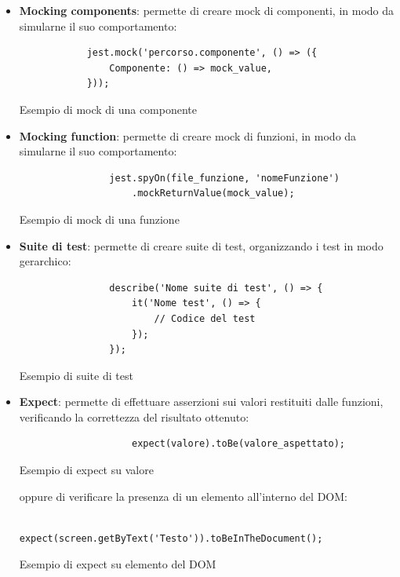 \begin{itemize}
    \item \textbf{Mocking components}: permette di creare mock di componenti, in modo da simularne il suo comportamento:
          \begin{listing}[H]
              \begin{verbatim}
            jest.mock('percorso.componente', () => ({
                Componente: () => mock_value,
            }));
            \end{verbatim}
              \caption{Esempio di mock di una componente}
              \label{listing:mock_component}
          \end{listing}
    \item \textbf{Mocking function}: permette di creare mock di funzioni, in modo da simularne il suo comportamento:
          \begin{listing}[H]
              \begin{verbatim}
                jest.spyOn(file_funzione, 'nomeFunzione')
                    .mockReturnValue(mock_value);
            \end{verbatim}
              \caption{Esempio di mock di una funzione}
              \label{listing:mock_function}
          \end{listing}
    \item \textbf{Suite di test}: permette di creare suite di test, organizzando i test in modo gerarchico:
          \begin{listing}[H]
              \begin{verbatim}
                describe('Nome suite di test', () => {
                    it('Nome test', () => {
                        // Codice del test
                    });
                });
            \end{verbatim}
              \caption{Esempio di suite di test}
              \label{listing:test_suite}
          \end{listing}
    \item \textbf{Expect}: permette di effettuare asserzioni sui valori restituiti dalle funzioni, verificando la correttezza
          del risultato ottenuto:
          \begin{listing}[H]
              \begin{verbatim}
                    expect(valore).toBe(valore_aspettato);
                \end{verbatim}
              \caption{Esempio di expect su valore}
              \label{listing:expect}
          \end{listing}
          oppure di verificare la presenza di un elemento all'interno del DOM:
          \begin{listing}[H]
              \begin{verbatim}
                    expect(screen.getByText('Testo')).toBeInTheDocument();
                \end{verbatim}
              \caption{Esempio di expect su elemento del DOM}
              \label{listing:expect_dom}
          \end{listing}
\end{itemize}
